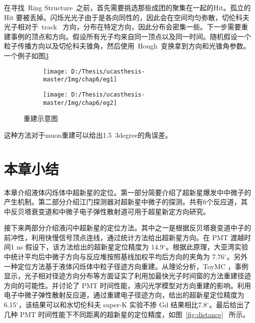 在寻找~Ring Structure~之前，首先需要挑选那些成团的聚集在一起的Hit。孤立的Hit 要被丢掉。闪烁光光子由于是各向同性的，因此会在空间均匀弥散，切伦科夫光子相对于~track~ 方向，分布在特定方向，因此分布会密集一些。下一步需要重建事例的顶点和方向。假设所有光子均来自同一顶点以及同一时间。随机假设一个粒子传播方向以及切伦科夫锥角，然后使用~Hough~变换拿到方向和光锥角参数。一个例子如图\ref{fig:p62}
\begin{figure}[!htb]
  \centering
  \begin{subfigure}[b]{\MySubFactor\textwidth}
    \texttt{[image: D:/Thesis/ucasthesis-master/Img/chap6/eg1]}
    \caption{}
    \label{fig:p62_1}
  \end{subfigure}%
  \quad\quad%
  \begin{subfigure}[b]{\MySubFactor\textwidth}
    \texttt{[image: D:/Thesis/ucasthesis-master/Img/chap6/eg2]}
    \caption{}
    \label{fig:p62_2}
  \end{subfigure}
  \caption{重建示意图}
  \label{fig:p62}
\end{figure}
这种方法对于muon重建可以给出1.5~3degree的角误差。
\section{本章小结}
本章介绍液体闪烁体中超新星的定位。第一部分简要介绍了超新星爆发中中微子的产生机制。第二部分介绍江门探测器对超新星中微子的探测。共有6个反应道，其中反贝塔衰变道和中微子电子弹性散射道可用于超星新定方向研究。

接下来两部分介绍液闪中超新星的定位方法。其中之一是根据反贝塔衰变道中子的前冲性，利用快慢信号顶点连线，通过统计方法给出超新星方向。在 PMT 渡越时间1 ns 假设下，该方法给出的超新星定位精度为 14.9$^\circ$。根据此原理，大亚湾实验中统计平均后中微子方向与反应堆按照基线加权平均后方向的夹角为 7.76$^\circ$。另外一种定位方法基于液体闪烁体中粒子径迹方向重建。从理论分析，ToyMC ，事例显示，光子相对径迹方向分布等方面证实了利用加最快光子时间窗的方法重建径迹方向的可能性。并讨论了 PMT 时间性能，液闪光学模型对方向重建的影响。利用电子中微子弹性散射反应道，通过重建电子径迹方向，给出的超新星定位精度为6.15$^\circ$，该结果可以和水切伦科夫 super-K 实验不掺 Gd 结果相比7.8$^\circ$。最后给出了几种 PMT 时间性能下不同距离的超新星的定位精度，如图~\ref{fig:distance}~ 所示。